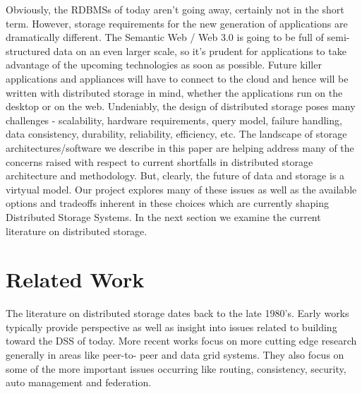 \documentclass[11pt]{article}
\begin{document}
Obviously, the RDBMSs of today aren't going away, certainly not in the
short term. However, storage requirements for the new generation of
applications are dramatically different. The Semantic Web / Web 3.0 is
going to be full of semi-structured data on an even larger scale, so
it's prudent for applications to take advantage of the upcoming
technologies as soon as possible. Future killer applications and
appliances will have to connect to the cloud and hence will be written
with distributed storage in mind, whether the applications run on the
desktop or on the web. Undeniably, the design of distributed storage
poses many challenges - scalability, hardware requirements, query
model, failure handling, data consistency, durability, reliability,
efficiency, etc. The landscape of storage architectures/software we
describe in this paper are helping address many of the concerns raised
with respect to current shortfalls in distributed storage architecture
and methodology. But, clearly, the future of data and storage is a
virtyual model. Our project explores many of these issues as well as
the available options and tradeoffs inherent in these choices which
are currently shaping Distributed Storage Systems. In the next section
we examine the current literature on distributed storage.

\section{Related Work}
The literature on distributed storage dates back to the late 1980’s. 
Early works typically provide perspective as well as insight into 
issues related to building toward the DSS of today. More recent works 
focus on more cutting edge research generally in areas like peer-to-
peer and data grid systems. They also focus on some of the more 
important issues occurring like routing, consistency, security, auto 
management and federation.
\end{document}
